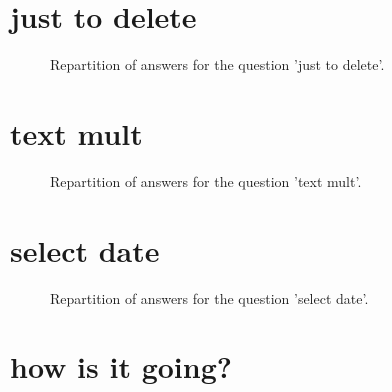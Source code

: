 \documentclass[12pt]{article}
\date{May 16, 2020}
\begin{document}
\clearpage{}
\section{just to delete}

\label{sec:24}


\begin{figure}[h!]
    \caption{\label{figure:q24-1}Repartition of answers for the question 'just to delete'.}
\end{figure}



\clearpage{}
\section{text mult}

\label{sec:14}


\begin{figure}[h!]
    \caption{\label{figure:q14-1}Repartition of answers for the question 'text mult'.}
\end{figure}



\clearpage{}
\section{select date}

\label{sec:21}


\begin{figure}[h!]
    \caption{\label{figure:q21-1}Repartition of answers for the question 'select date'.}
\end{figure}



\clearpage{}
\section{how is it going?}
\end{document}
